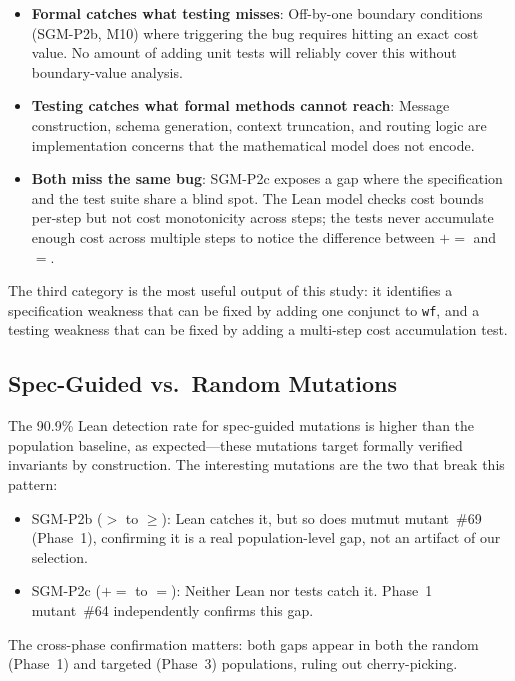 \documentclass[11pt,a4paper]{article}
\begin{document}
\begin{itemize}[nosep]
  \item \textbf{Formal catches what testing misses}: Off-by-one
    boundary conditions (SGM-P2b, M10) where triggering the bug
    requires hitting an exact cost value. No amount of adding unit
    tests will reliably cover this without boundary-value analysis.
  \item \textbf{Testing catches what formal methods cannot reach}:
    Message construction, schema generation, context truncation,
    and routing logic are implementation concerns that the
    mathematical model does not encode.
  \item \textbf{Both miss the same bug}: SGM-P2c exposes a gap where
    the specification and the test suite share a blind spot. The
    Lean model checks cost bounds per-step but not cost monotonicity
    across steps; the tests never accumulate enough cost across
    multiple steps to notice the difference between $+=$ and $=$.
\end{itemize}

The third category is the most useful output of this study: it
identifies a specification weakness that can be fixed by adding one
conjunct to \texttt{wf}, and a testing weakness that can be fixed
by adding a multi-step cost accumulation test.

\subsection{Spec-Guided vs.\ Random Mutations}

The 90.9\% Lean detection rate for spec-guided mutations is higher
than the population baseline, as expected---these mutations target
formally verified invariants by construction. The interesting
mutations are the two that break this pattern:

\begin{itemize}[nosep]
  \item SGM-P2b ($>$ to $\geq$): Lean catches it, but so does
    mutmut mutant~\#69 (Phase~1), confirming it is a real
    population-level gap, not an artifact of our selection.
  \item SGM-P2c ($+=$ to $=$): Neither Lean nor tests catch it.
    Phase~1 mutant~\#64 independently confirms this gap.
\end{itemize}

The cross-phase confirmation matters: both gaps appear in both
the random (Phase~1) and targeted (Phase~3) populations, ruling
out cherry-picking.
\end{document}

